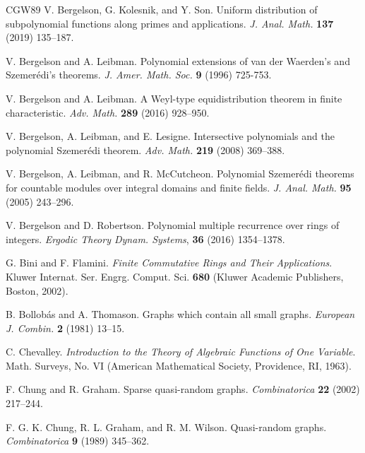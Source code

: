 \documentclass{amsart}
\theoremstyle{definition}
\numberwithin{equation}{section}
\begin{document}
\begin{thebibliography}{CGW89}
V. Bergelson, G. Kolesnik, and Y. Son.
\newblock   Uniform distribution of subpolynomial functions along primes and applications.
\newblock   \emph{J. Anal. Math.} \textbf{137} (2019) 135--187.

V. Bergelson and A. Leibman.
\newblock	Polynomial extensions of van der Waerden's and Szemer\'{e}di's theorems.
\newblock	\emph{J. Amer. Math. Soc.} \textbf{9} (1996) 725-753.

V. Bergelson and A. Leibman.
\newblock	A Weyl-type equidistribution theorem in finite characteristic.
\newblock	\emph{Adv. Math.} \textbf{289} (2016) 928--950.

V. Bergelson, A. Leibman, and E. Lesigne.
\newblock   Intersective polynomials and the polynomial Szemer\'{e}di theorem.
\newblock   \emph{Adv. Math.} \textbf{219} (2008) 369--388.

V. Bergelson, A. Leibman, and R. McCutcheon.
\newblock	Polynomial Szemerédi theorems for countable modules over integral domains and finite fields.
\newblock	\emph{J. Anal. Math.} \textbf{95} (2005) 243--296.

V. Bergelson and D. Robertson.
\newblock Polynomial multiple recurrence over rings of integers.
\newblock \emph{Ergodic Theory Dynam. Systems}, \textbf{36} (2016) 1354--1378.

G. Bini and F. Flamini.
\newblock   \emph{Finite Commutative Rings and Their Applications}.
\newblock   Kluwer Internat. Ser. Engrg. Comput. Sci. \textbf{680} (Kluwer Academic Publishers, Boston, 2002).

B. Bollob\'{a}s and A. Thomason.
\newblock   Graphs which contain all small graphs.
\newblock   \emph{European J. Combin.} \textbf{2} (1981) 13--15.

C. Chevalley.
\newblock   \emph{Introduction to the Theory of Algebraic Functions of One Variable}.
\newblock   Math. Surveys, No. VI (American Mathematical Society, Providence, RI, 1963).

F. Chung and R. Graham.
\newblock   Sparse quasi-random graphs.
\newblock   \emph{Combinatorica} \textbf{22} (2002) 217--244.

F. G. K. Chung, R. L. Graham, and R. M. Wilson.
\newblock   Quasi-random graphs.
\newblock   \emph{Combinatorica} \textbf{9} (1989) 345--362.


\end{thebibliography}
\end{document}
